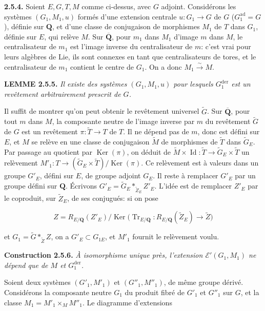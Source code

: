 \documentclass[10pt,a4paper]{article}
\begin{document}
\textbf{2.5.4.} Soient \(E,G,T,M\) comme ci-dessus, avec \(G\) adjoint. Considérons les systèmes \((G_1,M_1,u)\) formés d'une extension centrale \(u:G_1\to G\) de \(G\) (\(G_1^{\mathrm{ad}}=G\)), définie sur \(\mathbf Q\), et d'une classe de conjugaison de morphismes \(M_1\) de \(T\) dans \(G_1\), définie sur \(E\), qui relève \(M\). Sur \(\overline{\mathbf Q}\), pour \(m_1\) dans \(M_1\) d'image \(m\) dans \(M\), le centralisateur de \(m_1\) est l'image inverse du centralisateur de \(m\): c'est vrai pour leurs algèbres de Lie, ils sont connexes en tant que centralisateurs de tores, et le centralisateur de \(m_1\) contient le centre de \(G_1\). On a donc \(M_1\xrightarrow{\sim}M\).

\textbf{LEMME 2.5.5.} \emph{Il existe des systèmes \((G_1,M_1,u)\) pour lesquels \(G_1^{\mathrm{der}}\) est un revêtement arbitrairement prescrit de \(G\).}

Il suffit de montrer qu'on peut obtenir le revêtement universel \(\widetilde G\). Sur \(\overline{\mathbf Q}\), pour tout \(m\) dans \(M\), la composante neutre de l'image inverse par \(m\) du revêtement \(\widetilde G\) de \(G\) est un revêtement \(\pi:\widetilde T\to T\) de \(T\). Il ne dépend pas de \(m\), donc est défini sur \(E\), et \(M\) se relève en une classe de conjugaison \(\widetilde M\) de morphismes de \(\widetilde T\) dans \(\widetilde G_E\). Par passage au quotient par \(\operatorname{Ker}(\pi)\), on déduit de \(\widetilde M\times\operatorname{Id}:\widetilde T\to\widetilde G_E\times\widetilde T\) un relèvement \(M'_1:T\to(\widetilde G_E\times\widetilde T)/\operatorname{Ker}(\pi)\). Ce relèvement est à valeurs dans un groupe \(G'_E\), défini sur \(E\), de groupe adjoint \(G_E\). Il reste à remplacer \(G'_E\) par un groupe défini sur \(\mathbf Q\). Écrivons \(G'_E=\widetilde G_E*_{\widetilde Z_E}Z'_E\). L'idée est de remplacer \(Z'_E\) par le coproduit, sur \(\widetilde Z_E\), de ses conjugués: si on pose

\[
Z=R_{E/\mathbf Q}(Z'_E)/\operatorname{Ker}\bigl(\operatorname{Tr}_{E/\mathbf Q}:R_{E/\mathbf Q}(\widetilde Z_E)\longrightarrow\widetilde Z\bigr)
\]

et \(G_1=\widetilde G*_{\widetilde Z}Z\), on a \(G'_E\subset G_{1E}\), et \(M'_1\) fournit le relèvement voulu.

\textbf{Construction 2.5.6.} \emph{À isomorphisme unique près, l'extension \(\mathscr E'(G_1,M_1)\) ne dépend que de \(M\) et \(G_1^{\mathrm{der}}\).}

Soient deux systèmes \((G'_1,M'_1)\) et \((G''_1,M''_1)\), de même groupe dérivé. Considérons la composante neutre \(G_1\) du produit fibré de \(G'_1\) et \(G''_1\) sur \(G\), et la classe \(M_1=M'_1\times_M M''_1\). Le diagramme d'extensions
\end{document}
